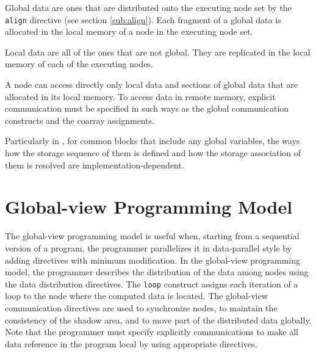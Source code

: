 Global data are ones that are distributed onto the executing node set by
the {\tt align} directive (see section \ref{sub:align}). Each fragment
of a global data is allocated in the local memory of a node in the
executing node set.
%
%

Local data are all of the ones that are not global. They are replicated
in the local memory of each of the executing nodes.


A node can access directly only local data and sections of global data
that are allocated in its local memory.
%
To access data in remote memory, explicit communication must be
specified in such ways as the global communication constructs and
the coarray assignments.


Particularly in {\XMPF}, for common blocks that include any global
variables, the ways how the storage sequence of them is defined and how
the storage association of them is resolved are
implementation-dependent.

\section{Global-view Programming Model}

The global-view programming model is useful when, starting from a
sequential version of a program, the programmer parallelizes it in
data-parallel style by adding directives with minimum modification.
%
In the global-view programming model, the programmer describes the
distribution of the data among nodes using the data distribution
directives.
%
The {\tt loop} construct assigns each iteration of a loop to the node
where the computed data is located. 
%
The global-view communication directives are used to synchronize nodes,
to maintain the consistency of the shadow area, and to move part of the
distributed data globally.
%
Note that the programmer must specify explicitly communications to make
all data reference in the program local by using appropriate directives.

